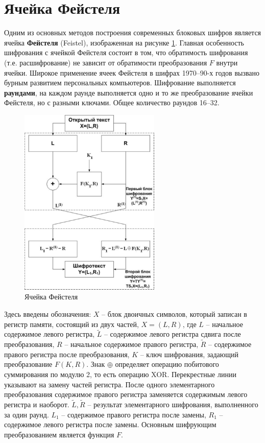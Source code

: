 \section{Ячейка Фейстеля}

Одним из основных методов построения современных блоковых шифров является ячейка \textbf{Фейстеля} (Feistel), изображенная на рисунке \ref{fig:Feistel}. Главная особенность шифрования с ячейкой Фейстеля состоит в том, что обратимость шифрования (т.е. расшифрование) не зависит от обратимости преобразования $F$ внутри ячейки. Широкое применение ячеек Фейстеля в шифрах 1970--90-х годов вызвано бурным развитием персональных компьютеров. Шифрование выполняется \textbf{раундами}, на каждом раунде выполняется одно и то же преобразование ячейки Фейстеля, но с разными ключами. Общее количество раундов 16--32.

\begin{figure}[h!]
    \centering
    \includegraphics[width=0.6\textwidth]{pic/feistel}
    \caption{Ячейка Фейстеля\label{fig:Feistel}}
\end{figure}

Здесь введены обозначения: $X$ -- блок двоичных символов, который записан в регистр памяти, состоящий из двух частей, $X = (L,R)$, где $L$ -- начальное содержимое левого регистра, $\tilde{L}$ -- содержимое левого регистра сдвига после преобразования, $R$ -- начальное содержимое правого регистра, $\tilde{R}$ -- содержимое правого регистра после преобразования, $K$ -- ключ шифрования, задающий преобразование $F(K,R)$. Знак $\oplus$ определяет операцию побитового суммирования по модулю 2, то есть операцию XOR. Перекрестные линии указывают на замену частей регистра. После одного элементарного преобразования содержимое правого регистра заменяется содержимым левого регистра и наоборот. $\tilde{L},\tilde{R}$ -- результат элементарного шифрования, выполненного за один раунд. $L_{1}$ -- содержимое правого регистра после замены, $R_{1}$ -- содержимое левого регистра после замены. Основным шифрующим преобразованием является функция $F$.

